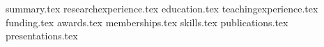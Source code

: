 \documentclass[12pt, a4paper]{awesome-cv}
\newcommand*{\sectiondir}{resume/}
\begin{document}
\makecvheader

{summary.tex}
{researchexperience.tex}
{education.tex}
{teachingexperience.tex}
{funding.tex}\vspace{-0.5cm}
{awards.tex}\vspace{-0.5cm}
{memberships.tex}
{skills.tex}
{publications.tex}
{presentations.tex}
\end{document}
